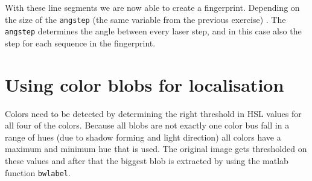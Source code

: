 \documentclass[a4paper, 20pt]{article}
\begin{document}
\begin{figure}[!ht]
\centering
\begin{floatrow}
  
\end{floatrow}
\end{figure}

With these line segments we are now able to create a fingerprint. Depending on
the size of the \texttt{angstep} (the same variable from the previous exercise)
. The \texttt{angstep} determines the angle between every laser step, and in
this case also the step for each sequence in the fingerprint.

\section{Using color blobs for localisation}
Colors need to be detected by determining the right threshold in HSL values for
all four of the colors. Because all blobs are not exactly one color bus fall in
a range of hues (due to shadow forming and light direction) all colors have a
maximum and minimum hue that is used.  
The original image gets thresholded on these values and
after that the biggest blob is extracted by using the matlab function
\texttt{bwlabel}.
\end{document}
